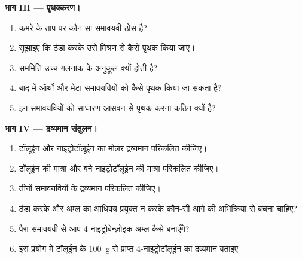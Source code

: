 \begin{problem}
\medskip
\noindent\textbf{भाग III --- पृथक्करण।}
\begin{enumerate}[resume]
  \item कमरे के ताप पर कौन-सा समावयवी ठोस है?
  \item सुझाइए कि ठंडा करके उसे मिश्रण से कैसे पृथक किया जाए।
  \item सममिति उच्च गलनांक के अनुकूल क्यों होती है?
  \item बाद में ऑर्थो और मेटा समावयवियों को कैसे पृथक किया जा सकता है?
  \item इन समावयवियों को साधारण आसवन से पृथक करना कठिन क्यों है?
\end{enumerate}

\medskip
\noindent\textbf{भाग IV --- द्रव्यमान संतुलन।}
\begin{enumerate}[resume]
  \item टॉलूईन और नाइट्रोटॉलूईन का मोलर द्रव्यमान परिकलित कीजिए।
  \item टॉलूईन की मात्रा और बने नाइट्रोटॉलूईन की मात्रा परिकलित कीजिए।
  \item तीनों समावयवियों के द्रव्यमान परिकलित कीजिए।
  \item ठंडा करके और अम्ल का आधिक्य प्रयुक्त न करके कौन-सी आगे की अभिक्रिया से बचना चाहिए?
  \item पैरा समावयवी से आप 4-नाइट्रोबेन्ज़ोइक अम्ल कैसे बनाएँगे?
  \item इस प्रयोग में टॉलूईन के \qty{100}{g} से प्राप्त 4-नाइट्रोटॉलूईन का द्रव्यमान बताइए।
\end{enumerate}
\end{problem}
